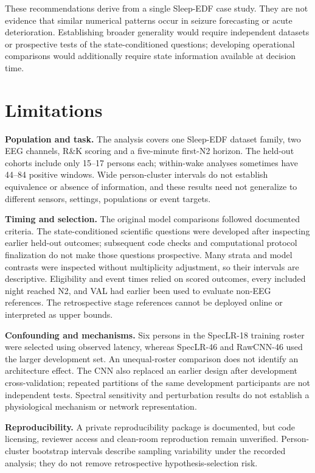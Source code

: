 \documentclass{article}
\begin{document}
These recommendations derive from a single Sleep-EDF case study. They are not evidence that similar numerical patterns occur in seizure forecasting or acute deterioration. Establishing broader generality would require independent datasets or prospective tests of the state-conditioned questions; developing operational comparisons would additionally require state information available at decision time.

\section{Limitations}
\label{sec:limitations}

\textbf{Population and task.} The analysis covers one Sleep-EDF dataset family, two EEG channels, R\&K scoring and a five-minute first-N2 horizon. The held-out cohorts include only 15--17 persons each; within-wake analyses sometimes have 44--84 positive windows. Wide person-cluster intervals do not establish equivalence or absence of information, and these results need not generalize to different sensors, settings, populations or event targets.

\textbf{Timing and selection.} The original model comparisons followed documented criteria. The state-conditioned scientific questions were developed after inspecting earlier held-out outcomes; subsequent code checks and computational protocol finalization do not make those questions prospective. Many strata and model contrasts were inspected without multiplicity adjustment, so their intervals are descriptive. Eligibility and event times relied on scored outcomes, every included night reached N2, and VAL had earlier been used to evaluate non-EEG references. The retrospective stage references cannot be deployed online or interpreted as upper bounds.

\textbf{Confounding and mechanisms.} Six persons in the SpecLR-18 training roster were selected using observed latency, whereas SpecLR-46 and RawCNN-46 used the larger development set. An unequal-roster comparison does not identify an architecture effect. The CNN also replaced an earlier design after development cross-validation; repeated partitions of the same development participants are not independent tests. Spectral sensitivity and perturbation results do not establish a physiological mechanism or network representation.

\textbf{Reproducibility.} A private reproducibility package is documented, but code licensing, reviewer access and clean-room reproduction remain unverified. Person-cluster bootstrap intervals describe sampling variability under the recorded analysis; they do not remove retrospective hypothesis-selection risk.
\end{document}
